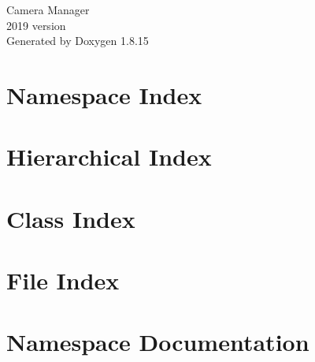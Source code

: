 \let\mypdfximage\pdfximage\def\pdfximage{\immediate\mypdfximage}\documentclass[twoside]{book}
\newcommand{\+}{\discretionary{\mbox{\scriptsize$\hookleftarrow$}}{}{}}
\newcommand{\clearemptydoublepage}{%
  \newpage{\pagestyle{empty}\cleardoublepage}%
}
\begin{document}
\hypersetup{pageanchor=false,
             bookmarksnumbered=true,
             pdfencoding=unicode
            }
\begin{titlepage}
\vspace*{7cm}
\begin{center}%
{\Large Camera Manager \\[1ex]\large 2019 version }\\
\vspace*{1cm}
{\large Generated by Doxygen 1.8.15}\\
\end{center}
\end{titlepage}
\clearemptydoublepage
{}
\tableofcontents
\clearemptydoublepage
{}
\hypersetup{pageanchor=true}

\chapter{Namespace Index}

\chapter{Hierarchical Index}

\chapter{Class Index}

\chapter{File Index}

\chapter{Namespace Documentation}






\end{document}

